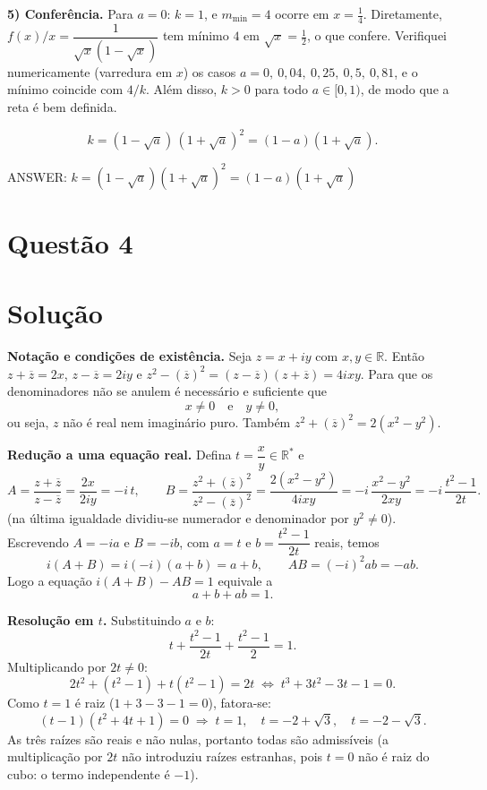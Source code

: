 \documentclass{article}%
\begin{document}
\textbf{5) Conferência.} 
Para $a=0$: $k=1$, e $m_{\min}=4$ ocorre em $x=\frac14$. Diretamente, $f(x)/x=\dfrac{1}{\sqrt{x}(1-\sqrt{x})}$ tem mínimo $4$ em $\sqrt{x}=\frac12$, o que confere. Verifiquei numericamente (varredura em $x$) os casos $a=0,\ 0{,}04,\ 0{,}25,\ 0{,}5,\ 0{,}81$, e o mínimo coincide com $4/k$. Além disso, $k>0$ para todo $a\in[0,1)$, de modo que a reta é bem definida.

\[
k=(1-\sqrt a)\,(1+\sqrt a)^2=(1-a)(1+\sqrt a).
\]

ANSWER: $k=(1-\sqrt{a})(1+\sqrt{a})^{2}=(1-a)(1+\sqrt{a})$%
\newpage%
\section*{Questão 4}

\section*{Solução}

\textbf{Notação e condições de existência.} Seja $z=x+iy$ com $x,y\in\mathbb{R}$. Então $z+\overline{z}=2x$, $z-\overline{z}=2iy$ e $z^2-(\overline{z})^2=(z-\overline{z})(z+\overline{z})=4ixy$. Para que os denominadores não se anulem é necessário e suficiente que
\[
x\neq 0 \quad\text{e}\quad y\neq 0,
\]
ou seja, $z$ não é real nem imaginário puro. Também $z^2+(\overline{z})^2=2(x^2-y^2)$.

\textbf{Redução a uma equação real.} Defina $t=\dfrac{x}{y}\in\mathbb{R}^*$ e
\[
A=\frac{z+\overline{z}}{z-\overline{z}}=\frac{2x}{2iy}=-i\,t,
\qquad
B=\frac{z^2+(\overline{z})^2}{z^2-(\overline{z})^2}=\frac{2(x^2-y^2)}{4ixy}=-i\,\frac{x^2-y^2}{2xy}=-i\,\frac{t^2-1}{2t}.
\]
(na última igualdade dividiu-se numerador e denominador por $y^2\neq 0$). Escrevendo $A=-ia$ e $B=-ib$, com $a=t$ e $b=\dfrac{t^2-1}{2t}$ reais, temos
\[
i(A+B)=i(-i)(a+b)=a+b,\qquad AB=(-i)^2ab=-ab .
\]
Logo a equação $i(A+B)-AB=1$ equivale a
\[
a+b+ab=1 .
\]

\textbf{Resolução em $t$.} Substituindo $a$ e $b$:
\[
t+\frac{t^2-1}{2t}+\frac{t^2-1}{2}=1 .
\]
Multiplicando por $2t\neq 0$:
\[
2t^2+(t^2-1)+t(t^2-1)=2t
\;\Longleftrightarrow\;
t^3+3t^2-3t-1=0 .
\]
Como $t=1$ é raiz ($1+3-3-1=0$), fatora-se:
\[
(t-1)(t^2+4t+1)=0 \;\Longrightarrow\; t=1,\quad t=-2+\sqrt3,\quad t=-2-\sqrt3 .
\]
As três raízes são reais e não nulas, portanto todas são admissíveis (a multiplicação por $2t$ não introduziu raízes estranhas, pois $t=0$ não é raiz do cubo: o termo independente é $-1$).
\end{document}
